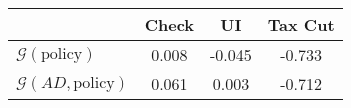\begin{tabular}{@{}lccc@{}} 
\toprule 
                          & Check      & UI    & Tax Cut    \\  \midrule 
$\mathcal{G}(\text{policy})$ & 0.008  & -0.045  & -0.733     \\ 
$\mathcal{G}(AD,\text{policy})$ & 0.061  & 0.003  & -0.712     \\ 
\end{tabular}  
